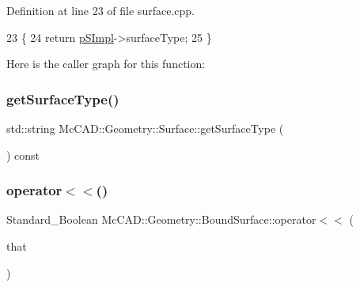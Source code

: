 Definition at line 23 of file surface.\+cpp.


\begin{DoxyCode}
23                                           \{
24   \textcolor{keywordflow}{return} \hyperlink{classMcCAD_1_1Geometry_1_1Surface_a0097d4e9bfc1c7cd7cd33d81492b9100}{pSImpl}->surfaceType;
25 \}
\end{DoxyCode}
Here is the caller graph for this function\+:
\mbox{\label{classMcCAD_1_1Geometry_1_1Surface_ac81308cae2d3fd458dfa311adea23688}} 
\subsubsection{\texorpdfstring{get\+Surface\+Type()}{getSurfaceType()}\hspace{0.1cm}{\footnotesize\ttfamily [2/2]}}
{\footnotesize\ttfamily std\+::string Mc\+C\+A\+D\+::\+Geometry\+::\+Surface\+::get\+Surface\+Type (\begin{DoxyParamCaption}{ }\end{DoxyParamCaption}) const\hspace{0.3cm}{\ttfamily [inherited]}}

\mbox{\label{classMcCAD_1_1Geometry_1_1BoundSurface_a2443caf3cbbe81e666df60745a92db28}} 
\subsubsection{\texorpdfstring{operator$<$$<$()}{operator<<()}\hspace{0.1cm}{\footnotesize\ttfamily [1/2]}}
{\footnotesize\ttfamily Standard\+\_\+\+Boolean Mc\+C\+A\+D\+::\+Geometry\+::\+Bound\+Surface\+::operator$<$$<$ (\begin{DoxyParamCaption}\item[{const \hyperlink{classMcCAD_1_1Geometry_1_1BoundSurface}{Bound\+Surface} \&}]{that }\end{DoxyParamCaption})}

